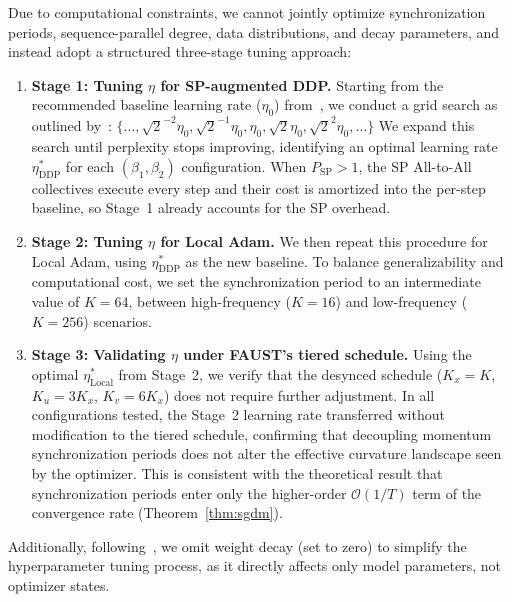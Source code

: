 \documentclass{article}
\begin{document}
Due to computational constraints, we cannot jointly optimize synchronization periods, sequence-parallel degree, data distributions, and decay parameters, and instead adopt a structured three-stage tuning approach:
\begin{enumerate}
    \item \textbf{Stage 1: Tuning $\eta$ for SP-augmented DDP.} Starting from the recommended baseline learning rate ($\eta_0$)
    from~\citet{allal2025smollm2}, we conduct a grid search as outlined by~\citet{zhuansun2024communicationefficientfederatedlearningadaptive}:
    $\{\ldots, \sqrt{2}^{-2}\eta_0, \sqrt{2}^{-1}\eta_0, \eta_0, \sqrt{2}\eta_0, \sqrt{2}^2\eta_0, \ldots\}$
    We expand this search until perplexity stops improving, identifying an optimal learning rate $\eta^*_{\text{DDP}}$ for each $(\beta_1, \beta_2)$ configuration.
    When $P_{\text{SP}} > 1$, the SP All-to-All collectives execute every step and their cost is amortized into the per-step baseline, so Stage~1 already accounts for the SP overhead.

    \item \textbf{Stage 2: Tuning $\eta$ for Local Adam.} We then repeat this procedure for Local Adam,
    using $\eta^*_{\text{DDP}}$ as the new baseline. To balance generalizability and computational cost, we set
    the synchronization period to an intermediate value of $K = 64$, between high-frequency ($K = 16$) and low-frequency ($K = 256$) scenarios.

    \item \textbf{Stage 3: Validating $\eta$ under FAUST's tiered schedule.}
    Using the optimal $\eta^*_{\text{Local}}$ from Stage~2, we verify that the desynced
    schedule ($K_x = K$, $K_u = 3K_x$, $K_v = 6K_x$) does not require further adjustment.
    In all configurations tested, the Stage~2 learning rate transferred without modification
    to the tiered schedule, confirming that decoupling momentum synchronization periods does
    not alter the effective curvature landscape seen by the optimizer.
    This is consistent with the theoretical result that synchronization periods enter only
    the higher-order $\mathcal{O}(1/T)$ term of the convergence rate
    (Theorem~\ref{thm:sgdm}).
\end{enumerate}

Additionally, following~\citet{merrill2025criticalbatchsizerevisited}, we omit weight decay (set to zero) to simplify the hyperparameter tuning process, as it directly affects only model parameters, not optimizer states.
\end{document}

